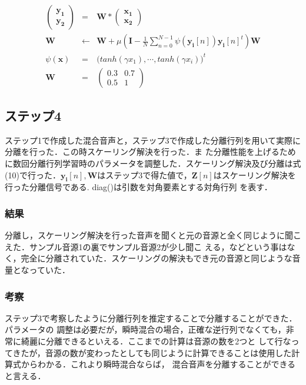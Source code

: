 \documentclass[a4j]{jarticle}
\begin{document}
\begin{eqnarray}
 \left(
\begin{array}{c}
 \bm{y_1}\\
\bm{y_2}
\end{array}
\right)
&=& \bm{W} * 
\left(
\begin{array}{c}
 \bm{x_1}\\
 \bm{x_2}
\end{array}
\right) \\
 \bm{W} &\leftarrow & \bm{W} + \mu \left(\bm{I} - \frac{1}{N}\sum_{n=0}^{N-1}\psi (\bm{y_i}[n])\bm{y_i}[n]^t \right)\bm{W} \\
 \psi (\bm{x}) &=& \bigl(tanh\left(\gamma x_1\right), \cdots , tanh\left(\gamma x_i\right) \bigr)^t \\
\bm{W} &=& \left(
 \begin{array}{cc}
  0.3 & 0.7\\
  0.5 & 1
 \end{array}
\right)
\end{eqnarray}

\subsection*{ステップ4}
ステップ1で作成した混合音声と，ステップ3で作成した分離行列を用いて実際に分離を行った．この時スケーリング解決を行った．ま
た分離性能を上げるために数回分離行列学習時のパラメータを調整した．スケーリング解決及び分離は式(10)で行った．$\bm{y_i}[n],
\bm{W}$はステップ3で得た値で，$\bm{Z}[n]$はスケーリング解決を行った分離信号である. diag()は引数を対角要素とする対角行列
を表す．
\subsubsection*{結果}
分離し，スケーリング解決を行った音声を聞くと元の音源と全く同じように聞こえた．サンプル音源1の裏でサンプル音源2が少し聞こ
える，などという事はなく，完全に分離されていた．スケーリングの解決もでき元の音源と同じような音量となっていた．
\subsubsection*{考察}
ステップ3で考察したように分離行列を推定することで分離することができた．パラメータの
調整は必要だが，瞬時混合の場合，正確な逆行列でなくても，非常に綺麗に分離できるといえる．ここまでの計算は音源の数を2つと
して行なってきたが，音源の数が変わったとしても同じように計算できることは使用した計算式からわかる．これより瞬時混合ならば，
混合音声を分離することができると言える．
\end{document}

